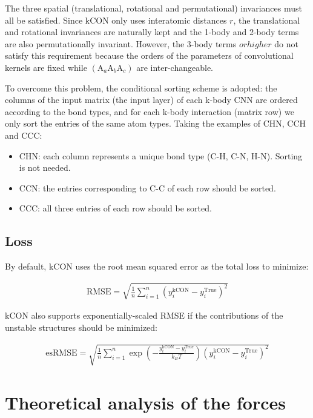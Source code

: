 \documentclass{article}
\begin{document}
The three spatial (translational, rotational and permutational) invariances must all be 
satisfied. Since kCON only uses interatomic distances $r$, the translational and 
rotational invariances are naturally kept and the 1-body and 2-body terms are also 
permutationally invariant. However, the 3-body terms \(or higher\) do not satisfy this
requirement because the orders of the parameters of convolutional kernels are fixed 
while $(\mathrm{A}_{a}\mathrm{A}_{b}\mathrm{A}_{c})$ are inter-changeable. 

To overcome this problem, the conditional sorting scheme is adopted: the columns of the 
input matrix (the input layer) of each k-body CNN are ordered according to the bond types, 
and for each k-body interaction (matrix row) we only sort the  entries of the same atom 
types. Taking the examples of CHN, CCH and CCC:

\begin{itemize}
	\item CHN: each column represents a unique bond type (C-H, C-N, H-N). Sorting is not needed.
	\item CCN: the entries corresponding to C-C of each row should be sorted.
	\item CCC: all three entries of each row should be sorted.
\end{itemize}

\subsection{Loss}

By default, kCON uses the root mean squared error as the total loss to minimize:

\begin{eqnarray}
\mathrm{RMSE} = \sqrt{
	\frac{1}{n}
	\sum_{i=1}^{n}{ 
		\left( y_{i}^{\mathrm{kCON}} - y_{i}^{\mathrm{True}} \right)^2
	}
}	
\end{eqnarray}

\noindent kCON also supports exponentially-scaled RMSE if the contributions of the unstable 
structures should be minimized:

\begin{eqnarray}
\mathrm{esRMSE} = \sqrt{
	\frac{1}{n} 
	\sum_{i=1}^{n}{
		\exp{\left(-\frac{y_{i}^{\mathrm{kCON}} - y_{i}^{\mathrm{True}}}{k_BT} \right)}
		\left(y_{i}^{\mathrm{kCON}} - y_{i}^{\mathrm{True}} \right)^2
	}
}	
\end{eqnarray}

\section{Theoretical analysis of the forces}
\end{document}
